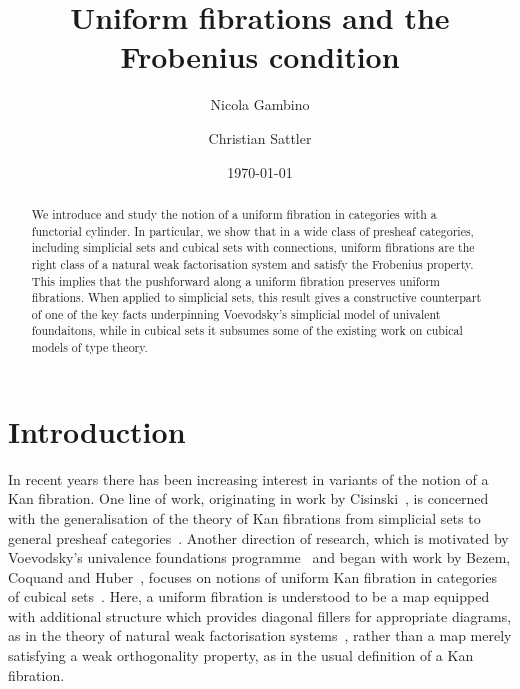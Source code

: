 \documentclass[reqno,10pt,a4paper,oneside,draft]{amsart}
\title{Uniform fibrations and the Frobenius condition}
\begin{document}
\begin{abstract}
We introduce and study the notion of a uniform fibration in categories with a functorial cylinder. In particular,
we show that in a wide class of presheaf categories, including simplicial sets and cubical sets with connections,
uniform fibrations are the right class of a natural weak factorisation system and 
satisfy the Frobenius property. This implies that the pushforward along a uniform fibration preserves uniform fibrations. 
When applied to simplicial sets, this result gives a constructive counterpart of one of the key facts underpinning Voevodsky's simplicial
model of univalent foundaitons, while in cubical sets it subsumes some of the existing work on cubical models of type theory.
\end{abstract}

\author{Nicola Gambino}
\address{School of Mathematics, University of Leeds, Leeds LS2 9JT, UK}

\author{Christian Sattler}
\address{School of Mathematics, University of Leeds, Leeds LS2 9JT, UK}

\date{\today}

\maketitle

\tableofcontents


\section{Introduction}

In recent years there has been increasing interest in variants of the notion of a Kan fibration.
One line of work, originating in work by Cisinski~\cite{cisinski-asterisque}, is concerned with the generalisation of the theory of Kan fibrations from simplicial sets to general presheaf categories~\cite{cisinski-univalence,moerdijk-minimal}.
Another direction of research, which is motivated by Voevodsky's univalence foundations programme~\cite{voevodsky:uf} and began with work by Bezem, Coquand and Huber~\cite{coquand-cubical-sets}, focuses on notions of uniform Kan fibration in categories of cubical sets~\cite{awodey-cubical,coquand-variation,huber-thesis,pitts-cubical-nominal,swan-awfs}.
Here, a uniform fibration is understood to be a map equipped with additional structure which provides diagonal fillers for appropriate diagrams, as in the theory of natural weak factorisation systems~\cite{grandis-tholen-nwfs}, rather than a map merely satisfying a weak orthogonality property, as in the usual definition of a Kan fibration.
\end{document}
